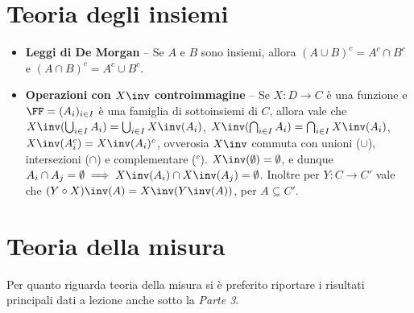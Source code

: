 \begin{multicols*}{2}
\section*{Teoria degli insiemi}

\begin{itemize}
    \item \textbf{Leggi di De Morgan} -- Se $A$ e $B$ sono insiemi, allora
    $(A \cup B)^c = A^c \cap B^c$ e $(A \cap B)^c = A^c \cup B^c$.
    \item \textbf{Operazioni con $X\inv$ controimmagine} -- Se $X : D \to C$ è
    una funzione e $\FF = (A_i)_{i \in I}$ è una famiglia di sottoinsiemi di $C$, allora vale che $X\inv(\bigcup_{i \in I} A_i) = \bigcup_{i \in I} X\inv(A_i)$,
    $X\inv(\bigcap_{i \in I} A_i) = \bigcap_{i \in I} X\inv(A_i)$,
    $X\inv(A_i^c) = X\inv(A_i)^c$, ovverosia $X\inv$ commuta con unioni ($\cup$),
    intersezioni ($\cap$) e complementare ($^c$). $X\inv(\emptyset) = \emptyset$, e dunque $A_i \cap A_j = \emptyset \implies X\inv(A_i) \cap X\inv(A_j) = \emptyset$.
    Inoltre per $Y : C \to C'$ vale che $(Y \circ X)\inv(A) = X\inv(Y\inv(A))$,
    per $A \subseteq C'$.
\end{itemize}

\section*{Teoria della misura}

Per quanto riguarda teoria della misura si è preferito
riportare i risultati principali dati a lezione anche sotto la
\textit{Parte 3}.


\end{multicols*}